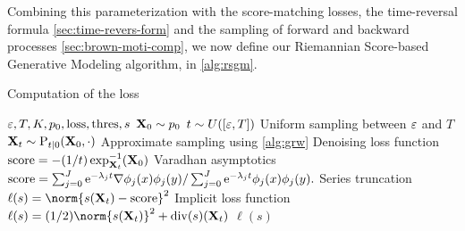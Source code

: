 %
Combining this parameterization with the score-matching losses, the
time-reversal formula \cref{sec:time-revers-form} and the sampling of forward
and backward processes \cref{sec:brown-moti-comp}, we now define our Riemannian
Score-based Generative Modeling algorithm, in \cref{alg:rsgm}.


  \begin{algorithm}[!t]
   \caption{\small Computation of the loss}
   \label{alg:rsgm}
   \begin{algorithmic}[1]
     \small
     \Require $\vareps, T, K, \pizero, , , s$
     \State $\mathbf{X}_0 \sim p_0$
     \State $t \sim U()$ \Comment Uniform sampling between $\varepsilon$ and $T$
     \State $\mathbf{X}_t \sim \mathrm{P}_{t|0}(\mathbf{X}_0, \cdot)$ \Comment Approximate sampling using \cref{alg:grw} 
      \Comment Denoising loss function
     \State $ = -(1/t) \exp^{-1}_{\bfX_t}(\bfX_0)$ \Comment Varadhan asymptotics
     \Else
     \State $ = \sum_{j=0}^J \rme^{-\lambda_j t} \nabla \phi_j(x) \phi_j(y) / \sum_{j=0}^J \rme^{-\lambda_j t} \phi_j(x) \phi_j(y).$ \Comment Series truncation
     \EndIf
     \State $\ell(s) = ^2$
     \Else \Comment Implicit loss function
     \State $\ell(s) = (1/2) ^2 + \dive(s)(\bfX_t)$
     \EndIf
       $\ell(s)$
    \end{algorithmic}
    \end{algorithm}


